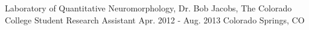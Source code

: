 \begin{cventries}
{    %
    }
  \cventry
  	{Laboratory of Quantitative Neuromorphology, Dr. Bob Jacobs, The Colorado College} %
    {Student Research Assistant} %
    {Apr. 2012 - Aug. 2013} %
    {Colorado Springs, CO} %
    {
    }
\end{cventries}
